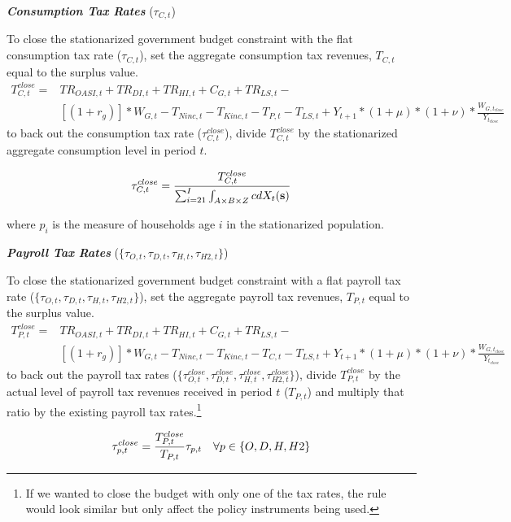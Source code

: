 \documentclass[11pt,leqno,fleqn]{article}
\newcommand{\be}{\vspace{-1em}\begin{singlespace}\begin{equation}}
\newcommand{\ee}{\end{equation}\end{singlespace}}
\begin{document}
\begin{flushleft}
\textbf{\textit{Consumption Tax Rates}} ($\tau_{C,t}$)
\end{flushleft}
To close the stationarized government budget constraint with the flat consumption tax rate ($\tau_{C,t}$), set the aggregate consumption tax revenues, $T_{C,t}$ equal to the surplus value.
\begin{align*}
T_{C,t}^{close} = &TR_{OASI,t} + TR_{DI,t} + TR_{HI,t} + C_{G,t} + TR_{LS,t} - \\
&[(1+r_g)]*W_{G,t} - T_{Ninc,t} - T_{Kinc,t} - T_{P,t} - T_{LS,t} + Y_{t+1}*(1+\mu)*(1+\nu)*\frac{W_{G,t_{close}}}{Y_{t_{close}}} 
\end{align*}
to back out the consumption tax rate ($\tau_{C,t}^{close}$), divide $T_{C,t}^{close}$ by the stationarized aggregate consumption level in period $t$.
\be \tau_{C,t}^{close} = \frac{T_{C,t}^{close}}{\sum_{i=21}^{I}\int_{A\times B\times Z}c dX_{t}(\mathbf{s})} \notag \ee
where $p_i$ is the measure of households age $i$ in the stationarized population.

\begin{flushleft}
\textbf{\textit{Payroll Tax Rates}} ($\{\tau_{O,t},\tau_{D,t},\tau_{H,t},\tau_{H2,t}\}$)
\end{flushleft}
To close the stationarized government budget constraint with a flat payroll tax rate ($\{\tau_{O,t},\tau_{D,t},\tau_{H,t},\tau_{H2,t}\}$), set the aggregate payroll tax revenues, $T_{P,t}$ equal to the surplus value.
\begin{align*}
T_{P,t}^{close} = &TR_{OASI,t} + TR_{DI,t} + TR_{HI,t} + C_{G,t} + TR_{LS,t} - \\
&[(1+r_g)]*W_{G,t} - T_{Ninc,t} - T_{Kinc,t} - T_{C,t} - T_{LS,t} + Y_{t+1}*(1+\mu)*(1+\nu)*\frac{W_{G,t_{close}}}{Y_{t_{close}}} 
\end{align*}
to back out the payroll tax rates ($\{\tau_{O,t}^{close},\tau_{D,t}^{close},\tau_{H,t}^{close},\tau_{H2,t}^{close}\}$), divide $T_{P,t}^{close}$ by the actual level of payroll tax revenues received in period $t$ ($T_{P,t}$) and multiply that ratio by the existing payroll tax rates.\footnote{If we wanted to close the budget with only one of the tax rates, the rule would look similar but only affect the policy instruments being used.}
\be \tau_{p,t}^{close} = \frac{T_{P,t}^{close}}{T_{P,t}}\tau_{p,t} \quad \forall p\in\{O,D,H,H2\} \notag \ee
\end{document}
